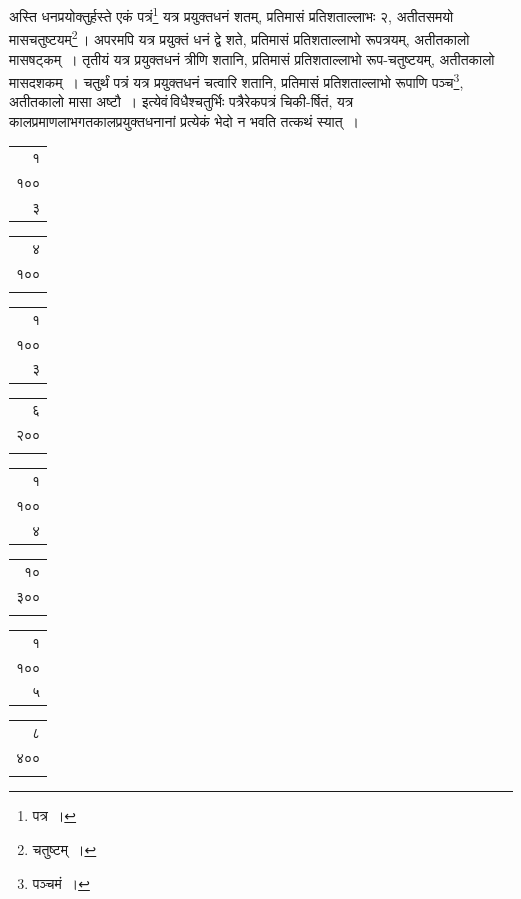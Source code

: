 \documentclass[10pt, openany]{book}
\begin{document}
{{{{अस्ति धनप्रयोक्तुर्हस्ते एकं पत्रं\renewcommand{\thefootnote}{\s ३}\footnote{\s पत्र~।} यत्र प्रयुक्तधनं शतम्,
प्रतिमासं प्रतिशताल्लाभः}
{२, अतीतसमयो मासचतुष्टयम्\renewcommand{\thefootnote}{\s ४}\footnote{\s *चतुष्टम्~।}\,। अपरमपि यत्र प्रयुक्तं धनं द्वे शते,
प्रतिमासं प्रतिशताल्लाभो}
{रूपत्रयम्, अतीतकालो मासषट्कम्~। तृतीयं यत्र प्रयुक्तधनं त्रीणि शतानि,
प्रतिमासं प्रतिशताल्लाभो रूप-चतुष्टयम्, अतीतकालो मासदशकम्~। चतुर्थं पत्रं यत्र
प्रयुक्तधनं चत्वारि}
{शतानि, प्रतिमासं प्रतिशताल्लाभो रूपाणि पञ्च\renewcommand{\thefootnote}{\s ५}\footnote{\s पञ्चमं~।}, अतीतकालो मासा अष्टौ~।
इत्येवं\textendash \,विधैश्चतुर्भिः पत्रैरेकपत्रं चिकी-र्षितं, यत्र
कालप्रमाणलाभगतकालप्रयुक्तधनानां प्रत्येकं भेदो}
{न भवति तत्कथं स्यात्~।}

\vspace{0.3cm}{चतुर्णां पत्राणां पृथक् स्थापनम्\textemdash}
\begin{center}
\begin{tabular}{r|}१ \\ १०० \\ ३ \end{tabular}
\begin{tabular}{r|}४ \\ १०० \\ \\ \end{tabular}
\begin{tabular}{r|}१ \\ १०० \\ ३ \end{tabular}
\begin{tabular}{r|}६ \\ २०० \\   \\    \end{tabular}
\begin{tabular}{r|}१ \\ १०० \\४ \end{tabular}
\begin{tabular}{r|}१० \\ ३०० \\ \\ \end{tabular}
\begin{tabular}{r|}१ \\१०० \\ ५\end{tabular}
\begin{tabular}{r|}८ \\४०० \\ \\ \end{tabular}
\end{center}

}}}
\end{document}
